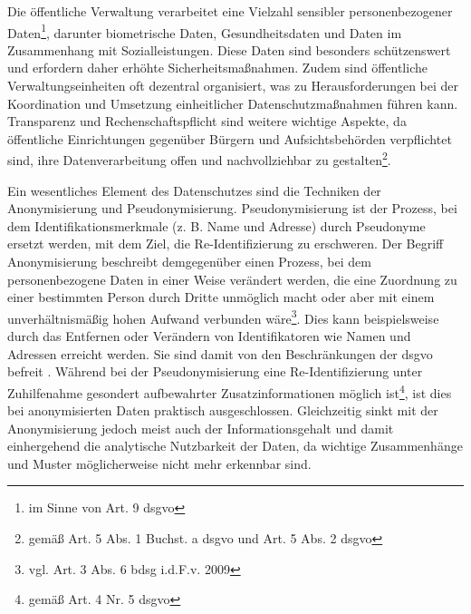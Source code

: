 \begin{spacing}{1.5}
Die öffentliche Verwaltung verarbeitet eine Vielzahl sensibler personenbezogener Daten\footnote{im Sinne von Art. 9 \acrshort{dsgvo}}, darunter biometrische Daten, Gesundheitsdaten und Daten im Zusammenhang mit Sozialleistungen. Diese Daten sind besonders schützenswert und erfordern daher erhöhte Sicherheitsmaßnahmen. Zudem sind öffentliche Verwaltungseinheiten oft dezentral organisiert, was zu Herausforderungen bei der Koordination und Umsetzung einheitlicher Datenschutzmaßnahmen führen kann. Transparenz und Rechenschaftspflicht sind weitere wichtige Aspekte, da öffentliche Einrichtungen gegenüber Bürgern und Aufsichtsbehörden verpflichtet sind, ihre Datenverarbeitung offen und nachvollziehbar zu gestalten\footnote{gemäß Art. 5 Abs. 1 Buchst. a \acrshort{dsgvo} und Art. 5 Abs. 2 \acrshort{dsgvo}}.

Ein wesentliches Element des Datenschutzes sind die Techniken der Anonymisierung und Pseudonymisierung. Pseudonymisierung ist der Prozess, bei dem Identifikationsmerkmale (z. B. Name und Adresse) durch Pseudonyme ersetzt werden, mit dem Ziel, die Re-Identifizierung zu erschweren. Der Begriff Anonymisierung beschreibt demgegenüber einen Prozess, bei dem personenbezogene Daten in einer Weise verändert werden, die eine Zuordnung zu einer bestimmten Person durch Dritte unmöglich macht oder aber mit einem unverhältnismäßig hohen Aufwand verbunden wäre\footnote{vgl. Art. 3 Abs. 6 \acrshort{bdsg} i.d.F.v. 2009}. Dies kann beispielsweise durch das Entfernen oder Verändern von Identifikatoren wie Namen und Adressen erreicht werden. Sie sind damit von den Beschränkungen der \acrshort{dsgvo} befreit \cite[184]{dewes_verfahren_2022}. Während bei der Pseudonymisierung eine Re-Identifizierung unter Zuhilfenahme gesondert aufbewahrter Zusatzinformationen möglich ist\footnote{gemäß Art. 4 Nr. 5 \acrshort{dsgvo}}, ist dies bei anonymisierten Daten praktisch ausgeschlossen. Gleichzeitig sinkt mit der Anonymisierung jedoch meist auch der Informationsgehalt und damit einhergehend die analytische Nutzbarkeit der Daten, da wichtige Zusammenhänge und Muster möglicherweise nicht mehr erkennbar sind.

\end{spacing}
